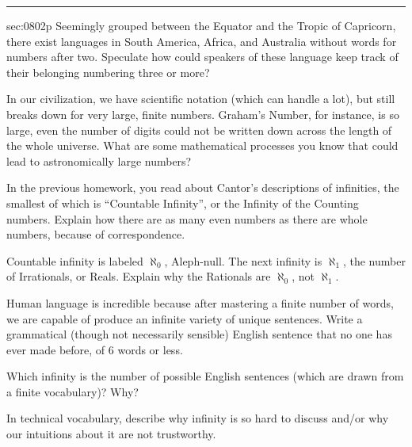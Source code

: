 \renewcommand{\columnseprule}{1.5pt}
\begin{multicols*}{2}
\rule[0.5\baselineskip]{0.4\textwidth}{1pt}
\noindent
{}\label{sec:0802p}
\begin{exercises}{sec:0802p}
\lab{} Seemingly grouped between the Equator and the Tropic of Capricorn, there exist languages in South America, Africa, and Australia without words for numbers after two.  Speculate how could speakers of these language keep track of their belonging numbering three or more?


\vspace{5cm}
\lab{} In our civilization, we have scientific notation (which can handle a lot), but still breaks down for very large, finite numbers.  Graham’s Number, for instance, is so large, even the number of digits could not be written down across the length of the whole universe.  What are some mathematical processes you know that could lead to astronomically large numbers?

\vspace{4cm}
\lab{} In the previous homework, you read about Cantor’s descriptions of infinities, the smallest of which is ``Countable Infinity'', or the Infinity of the Counting numbers.  Explain how there are as many even numbers as there are whole numbers, because of correspondence.

\vspace{4cm}
\lab{} Countable infinity is labeled $\aleph_0$, Aleph-null.  The next infinity is $\aleph_1$, the number of Irrationals, or Reals.  Explain why the Rationals are $\aleph_0$, not $\aleph_1$.

\vspace{4cm}
\lab{} Human language is incredible because after mastering a finite number of words, we are capable of produce an infinite variety of unique sentences.  Write a grammatical (though not necessarily sensible) English sentence that no one has ever made before, of 6 words or less.

\vspace{5cm}
\lab{} Which infinity is the number of possible English sentences (which are drawn from a finite vocabulary)?  Why?

\vspace{4cm}
\lab{} In technical vocabulary, describe why infinity is so hard to discuss and/or why our intuitions about it are not trustworthy.


\end{exercises}
\end{multicols*}